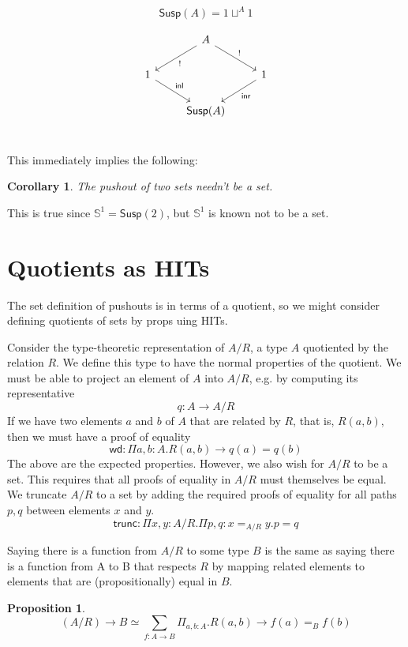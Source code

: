 \documentclass[11pt]{article}
\renewcommand{\SS}{\mathbb{S}}
\newcommand{\susp}[1]{\mathsf{Susp}(#1)}
\newtheorem{proposition}{Proposition}
\newtheorem{cor}{Corollary}
\begin{document}
$$\susp A = 1 \sqcup^A 1$$

\begin{equation*}
\begin{tikzcd}
{} & A \arrow{dr}{!} \arrow{dl}{!} & {}\\
1 \arrow{dr}{\inl} & {} & 1 \arrow{dl}{\inr} \\
{} & \susp{A} & {}\\
\end{tikzcd}
\end{equation*}

This immediately implies the following:
\begin{cor}The pushout of two sets needn't be a set.\end{cor}
This is true since $\SS^1 = \susp{2}$, but $\SS^1$ is known not to be a set.


\section{Quotients as HITs}
\newcommand{\trunc}{\mathsf{trunc}}
The set definition of pushouts is in terms of a quotient, so we might
consider defining quotients of sets by props uing HITs.

Consider the type-theoretic representation of $A/R$, a type $A$ quotiented
by the relation $R$. We define this type to have the normal properties of the
quotient. We must be able to project an element of $A$ into $A/R$, e.g. by
computing its representative
$$q : A \to A/R$$
If we have two elements $a$ and $b$ of $A$ that are related by $R$, that is,
$R(a, b)$, then we must have a proof of equality
$$\mathsf{wd}: \Pi a,b: A. R(a,b) \to q(a) = q(b)$$
The above are the expected properties. However, we also wish for
$A/R$ to be a set. This requires that all proofs of equality in $A/R$ must
themselves be equal. We truncate $A/R$ to a set by adding the required proofs
of equality for all paths $p, q$ between elements $x$ and $y$.
$$\trunc : \Pi x,y: A/R. \Pi p, q : x =_{A/R} y. p = q$$

Saying there is a function from $A/R$ to some type $B$ is the same as saying there is a function from A to B that respects $R$ by mapping related elements
to elements that are (propositionally) equal in $B$.

\begin{proposition}
$$(A/R) \rightarrow B \simeq \sum_{f : A \rightarrow B} \Pi_{a, b : A} . R(a, b) \rightarrow f(a) =_B f(b)$$
\end{proposition}
\end{document}
